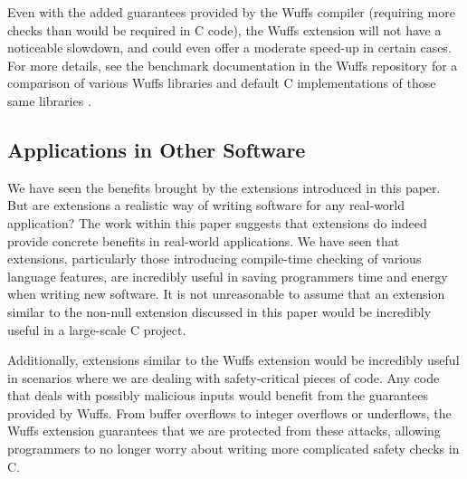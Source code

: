 \documentclass[main.tex]{subfiles}
\begin{document}
Even with the added guarantees provided by the Wuffs compiler (requiring more checks than would be required in C code),
the Wuffs extension will not have a noticeable slowdown, and could even offer a moderate speed-up in certain cases. For
more details, see the benchmark documentation in the Wuffs repository for a comparison of various Wuffs libraries and
default C implementations of those same libraries \cite{4}. 

\subsection{Applications in Other Software}
We have seen the benefits brought by the extensions introduced in this paper. But are extensions a realistic way of writing
software for any real-world application? The work within this paper suggests that extensions do indeed provide concrete
benefits in real-world applications. We have seen that extensions, particularly those introducing compile-time checking of
various language features, are incredibly useful in saving programmers time and energy when writing new software. It is not
unreasonable to assume that an extension similar to the non-null extension discussed in this paper would be incredibly useful
in a large-scale C project.

Additionally, extensions similar to the Wuffs extension would be incredibly useful in scenarios where we are dealing with
safety-critical pieces of code. Any code that deals with possibly malicious inputs would benefit from the guarantees provided
by Wuffs. From buffer overflows to integer overflows or underflows, the Wuffs extension guarantees that we are protected from
these attacks, allowing programmers to no longer worry about writing more complicated safety checks in C.
\end{document}

